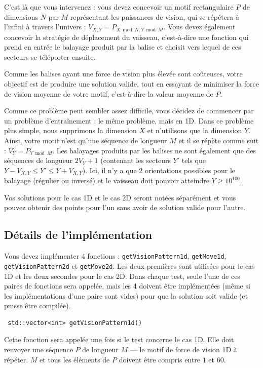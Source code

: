 \documentclass[12pt]{article}
\begin{document}
C'est là que vous intervenez : vous devez concevoir un motif rectangulaire $P$ de dimensions $N$ par $M$ représentant les puissances de vision, qui se répétera à l'infini à travers l'univers : $V_{X, Y} = P_{X \bmod N, Y \bmod M}$. Vous devez également concevoir la stratégie de déplacement du vaisseau, c'est-à-dire une fonction qui prend en entrée le balayage produit par la balise et choisit vers lequel de ces secteurs se téléporter ensuite.

Comme les balises ayant une force de vision plus élevée sont coûteuses, votre objectif est de produire une solution valide, tout en essayant de minimiser la force de vision moyenne de votre motif, c'est-à-dire la valeur moyenne de $P$.

Comme ce problème peut sembler assez difficile, vous décidez de commencer par un problème d'entraînement : le même problème, mais en 1D. Dans ce problème plus simple, nous supprimons la dimension $X$ et n'utilisons que la dimension $Y$. Ainsi, votre motif n'est qu'une séquence de longueur $M$ et il se répète comme suit : $V_Y = P_{Y \bmod M}$. Les balayages produits par les balises ne sont également que des séquences de longueur $2V_Y + 1$ (contenant les secteurs $Y'$ tels que $Y - V_{X, Y} \leq Y' \leq Y + V_{X, Y}$). Ici, il n'y a que 2 orientations possibles pour le balayage (régulier ou inversé) et le vaisseau doit pouvoir atteindre $Y \geq 10^{100}$.

Vos solutions pour le cas 1D et le cas 2D seront notées séparément et vous pouvez obtenir des points pour l'un sans avoir de solution valide pour l'autre.

\subsection{Détails de l'implémentation}

Vous devez implémenter 4 fonctions : \verb|getVisionPattern1d|, \verb|getMove1d|, \verb|getVisionPattern2d| et \verb|getMove2d|. Les deux premières sont utilisées pour le cas 1D et les deux secondes pour le cas 2D. Dans chaque test, seule l'une de ces paires de fonctions sera appelée, mais les 4 doivent être implémentées (même si les implémentations d'une paire sont vides) pour que la solution soit valide (et puisse être compilée).

\begin{lstlisting}
 std::vector<int> getVisionPattern1d()
\end{lstlisting}

Cette fonction sera appelée une fois si le test concerne le cas 1D. Elle doit renvoyer une séquence $P$ de longueur $M$ — le motif de force de vision 1D à répéter. $M$ et tous les éléments de $P$ doivent être compris entre $1$ et $60$.
\end{document}
